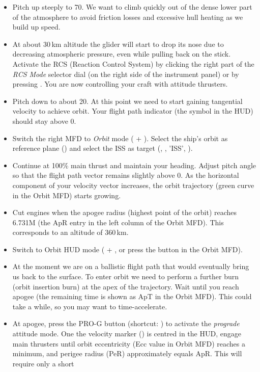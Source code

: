 \documentclass[Orbiter User Manual.tex]{subfiles}
\begin{document}
\begin{itemize}
	\item Pitch up steeply to 70\deg{}. We want to climb quickly out of the
		dense lower part of the atmosphere to avoid friction losses and
		excessive hull heating as we build up speed.
	\item At about 30\,km altitude the glider will start to drop its nose due to
		decreasing atmospheric pressure, even while pulling back on the stick.
		Activate the RCS (Reaction Control System) by clicking the right part of
		the \emph{RCS Mode} selector dial (on the right side of the instrument
		panel) or by pressing \keystroke{/}\num{}. You are now controlling your
		craft with attitude thrusters.
	\item Pitch down to about 20\deg{}. At this point we need to start gaining
		tangential velocity to achieve orbit. Your flight path indicator (the
		\prograde{} symbol in the HUD) should stay above 0\deg{}.
	\item Switch the right MFD to \emph{Orbit} mode ( + ).
		Select the ship's orbit as reference plane () and select the
		ISS as target (, \Enter, 'ISS', \Enter).
	\item Continue at 100\% main thrust and maintain your heading. Adjust pitch
		angle so that the flight path vector remains slightly above 0\deg{}. As
		the horizontal component of your velocity vector increases, the orbit
		trajectory (green curve in the Orbit MFD) starts growing.
	\item Cut engines when the apogee radius (highest point of the orbit)
		reaches 6.731M (the ApR entry in the left column of the Orbit MFD). This
		corresponds to an altitude of 360\,km.
	\item Switch to Orbit HUD mode ( + , or press the
		 button in the Orbit MFD).
	\item At the moment we are on a ballistic flight path that would eventually
		bring us back to the surface. To enter orbit we need to perform a
		further burn (orbit insertion burn) at the apex of the trajectory. Wait
		until you reach apogee (the remaining time is shown as ApT in the Orbit
		MFD). This could take a while, so you may want to time-accelerate.
	\item At apogee, press the PRO-G button (shortcut: \keystroke{[}) to
		activate the \emph{prograde} attitude mode. One the velocity marker
		(\prograde) is centred in the HUD, engage main thrusters until orbit
		eccentricity (Ecc value in Orbit MFD) reaches a minimum, and perigee
		radius (PeR) approximately equals ApR. This will require only a short

\end{itemize}
\end{document}
